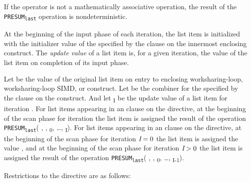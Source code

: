 If the operator  is not a mathematically associative operation, the result of
the \texttt{PRESUM\textsubscript{last}} operation is nondeterministic.

At the beginning of the input phase of each iteration, the list item is
initialized with the initializer value of the 
specified by the  clause on the innermost enclosing construct.
The \textit{update value} of a list item is, for a given iteration, the value
of the list item on completion of its input phase. 

Let  be the value of the original list item on entry to
enclosing worksharing-loop, worksharing-loop SIMD, or  construct. Let  be the
combiner for the  specified by the 
clause on the construct. And let \textsubscript{I} be the update value
of a list item for iteration .  For list items appearing in an
 clause on the  directive, at the beginning of the
scan phase for iteration  the list item is assigned the result of the
operation \texttt{PRESUM\textsubscript{last}}( , ,
\textsubscript{0}, \ldots, \textsubscript{I}).  For list items
appearing in an  clause on the  directive, at the
beginning of the scan phase for iteration $\plc{I} = 0$  the list item is
assigned the value , and at the beginning of the scan phase for
iteration $\plc{I} > 0$  the list item is assigned the result of the operation
\texttt{PRESUM\textsubscript{last}}( , ,
\textsubscript{0}, \ldots, \textsubscript{I-1}).


\restrictions
Restrictions to the  directive are as follows:

